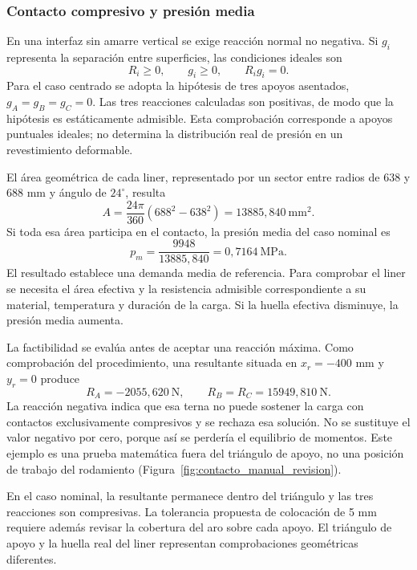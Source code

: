 \subsubsection{Contacto compresivo y presión media}

En una interfaz sin amarre vertical se exige reacción normal no negativa. Si $g_i$ representa la separación entre superficies, las condiciones ideales son
\begin{equation}
R_i\geq0,\qquad g_i\geq0,\qquad R_i g_i=0.
\label{eq:manual_contacto}
\end{equation}
Para el caso centrado se adopta la hipótesis de tres apoyos asentados, $g_A=g_B=g_C=0$. Las tres reacciones calculadas son positivas, de modo que la hipótesis es estáticamente admisible. Esta comprobación corresponde a apoyos puntuales ideales; no determina la distribución real de presión en un revestimiento deformable.

El área geométrica de cada liner, representado por un sector entre radios de 638 y 688 mm y ángulo de $24^\circ$, resulta
\begin{equation}
A=\frac{24\pi}{360}\left(688^2-638^2\right)
=13885{,}840\ \mathrm{mm^2}.
\label{eq:manual_area}
\end{equation}
Si toda esa área participa en el contacto, la presión media del caso nominal es
\begin{equation}
\boxed{p_m=\frac{9948}{13885{,}840}=0{,}7164\ \mathrm{MPa}.}
\label{eq:manual_presion}
\end{equation}
El resultado establece una demanda media de referencia. Para comprobar el liner se necesita el área efectiva y la resistencia admisible correspondiente a su material, temperatura y duración de la carga. Si la huella efectiva disminuye, la presión media aumenta.

La factibilidad se evalúa antes de aceptar una reacción máxima. Como comprobación del procedimiento, una resultante situada en $x_r=-400$ mm y $y_r=0$ produce
\[
R_A=-2055{,}620\ \mathrm{N},\qquad
R_B=R_C=15949{,}810\ \mathrm{N}.
\]
La reacción negativa indica que esa terna no puede sostener la carga con contactos exclusivamente compresivos y se rechaza esa solución. No se sustituye el valor negativo por cero, porque así se perdería el equilibrio de momentos. Este ejemplo es una prueba matemática fuera del triángulo de apoyo, no una posición de trabajo del rodamiento (Figura~\ref{fig:contacto_manual_revision}).

En el caso nominal, la resultante permanece dentro del triángulo y las tres reacciones son compresivas. La tolerancia propuesta de colocación de 5 mm requiere además revisar la cobertura del aro sobre cada apoyo. El triángulo de apoyo y la huella real del liner representan comprobaciones geométricas diferentes.

